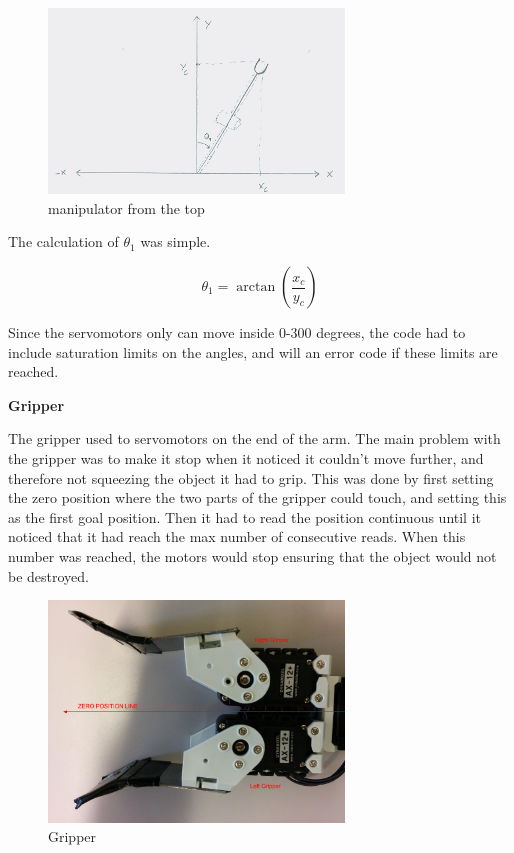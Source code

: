 \begin{figure}[H]
    \centering
    \includegraphics[width=0.7\textwidth]{graphics/Inverse_kinematic_2.jpg}
    \caption{manipulator from the top}
    \label{fig:manipulator_top} 
\end{figure}

The calculation of $\theta_{1}$ was simple.

$$\theta_{1} = \arctan(\frac{x_{c}}{y_{c}})$$

Since the servomotors only can move inside 0-300 degrees, the code had to include saturation limits on the angles, and will an error code if these limits are reached.
\bigskip

\textbf{Gripper}

The gripper used to servomotors on the end of the arm. The main problem with the gripper was to make it stop when it noticed it couldn't move further, and therefore not squeezing the object it had to grip. This was done by first setting the zero position where the two parts of the gripper could touch, and setting this as the first goal position. Then it had to read the position continuous until it noticed that it had reach the max number of consecutive reads. When this number was reached, the motors would stop ensuring that the object would not be destroyed.

\begin{figure}[H]
    \centering
    \includegraphics[width=0.7\textwidth]{graphics/Gripper.png}
    \caption{Gripper}
    \label{fig:gripper} 
\end{figure}

